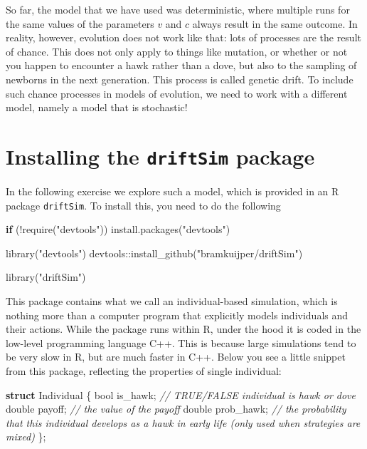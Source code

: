 \documentclass[
]{book}
\newenvironment{Shaded}{\begin{snugshade}}{\end{snugshade}}
\newcommand{\CommentTok}[1]{\textcolor[rgb]{0.56,0.35,0.01}{\textit{#1}}}
\newcommand{\ControlFlowTok}[1]{\textcolor[rgb]{0.13,0.29,0.53}{\textbf{#1}}}
\newcommand{\DataTypeTok}[1]{\textcolor[rgb]{0.13,0.29,0.53}{#1}}
\newcommand{\FunctionTok}[1]{\textcolor[rgb]{0.00,0.00,0.00}{#1}}
\newcommand{\KeywordTok}[1]{\textcolor[rgb]{0.13,0.29,0.53}{\textbf{#1}}}
\newcommand{\NormalTok}[1]{#1}
\newcommand{\SpecialCharTok}[1]{\textcolor[rgb]{0.00,0.00,0.00}{#1}}
\newcommand{\StringTok}[1]{\textcolor[rgb]{0.31,0.60,0.02}{#1}}
\begin{document}
So far, the model that we have used was deterministic, where multiple runs for the same values of the parameters \(v\) and \(c\) always result in the same outcome. In reality, however, evolution does not work like that: lots of processes are the result of chance. This does not only apply to things like mutation, or whether or not you happen to encounter a hawk rather than a dove, but also to the sampling of newborns in the next generation. This process is called genetic drift. To include such chance processes in models of evolution, we need to work with a different model, namely a model that is stochastic!

\hypertarget{installing-the-driftsim-package}{%
\section{\texorpdfstring{Installing the \texttt{driftSim} package}{Installing the driftSim package}}\label{installing-the-driftsim-package}}

In the following exercise we explore such a model, which is provided in an R package \texttt{driftSim}. To install this, you need to do the following

\begin{Shaded}
\begin{Highlighting}[]
\ControlFlowTok{if}\NormalTok{ (}\SpecialCharTok{!}\FunctionTok{require}\NormalTok{(}\StringTok{"devtools"}\NormalTok{)) }\FunctionTok{install.packages}\NormalTok{(}\StringTok{"devtools"}\NormalTok{)}

\FunctionTok{library}\NormalTok{(}\StringTok{"devtools"}\NormalTok{)}
\NormalTok{devtools}\SpecialCharTok{::}\FunctionTok{install\_github}\NormalTok{(}\StringTok{"bramkuijper/driftSim"}\NormalTok{)}

\FunctionTok{library}\NormalTok{(}\StringTok{"driftSim"}\NormalTok{)}
\end{Highlighting}
\end{Shaded}

This package contains what we call an individual-based simulation, which is nothing more than a computer program that explicitly models individuals and their actions. While the package runs within R, under the hood it is coded in the low-level programming language C++. This is because large simulations tend to be very slow in R, but are much faster in C++. Below you see a little snippet from this package, reflecting the properties of single individual:

\begin{Shaded}
\begin{Highlighting}[]
\KeywordTok{struct}\NormalTok{ Individual \{}
    \DataTypeTok{bool}\NormalTok{ is\_hawk; }\CommentTok{// TRUE/FALSE individual is hawk or dove}
    \DataTypeTok{double}\NormalTok{ payoff; }\CommentTok{// the value of the payoff}
    \DataTypeTok{double}\NormalTok{ prob\_hawk; }\CommentTok{// the probability that this individual develops as a hawk in early life (only used when strategies are mixed)}
\NormalTok{\};}
\end{Highlighting}
\end{Shaded}
\end{document}

